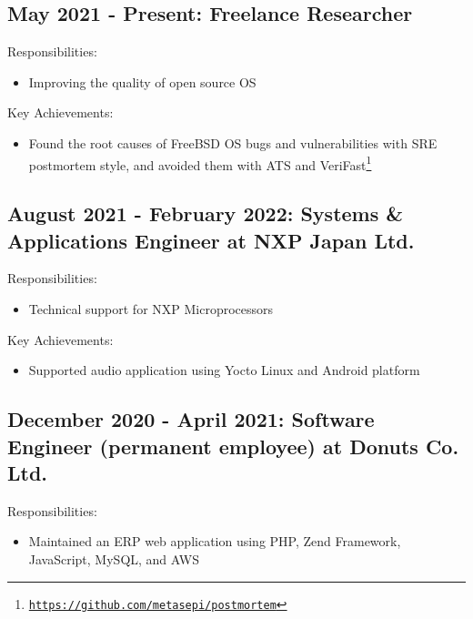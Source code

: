 \documentclass[letterpaper]{article}
\begin{document}
\subsection*{May 2021 - Present: Freelance Researcher}

\noindent Responsibilities:

\begin{itemize}
  \item Improving the quality of open source OS
\end{itemize}

\noindent Key Achievements:

\begin{itemize}
  \item Found the root causes of FreeBSD OS bugs and vulnerabilities with SRE postmortem style, and avoided them with ATS and VeriFast\footnote{\href{https://github.com/metasepi/postmortem}{\tt https://github.com/metasepi/postmortem}}
\end{itemize}

\subsection*{August 2021 - February 2022: Systems \& Applications Engineer at NXP Japan Ltd.}

\noindent Responsibilities:

\begin{itemize}
  \item Technical support for NXP Microprocessors
\end{itemize}

\noindent Key Achievements:

\begin{itemize}
  \item Supported audio application using Yocto Linux and Android platform
\end{itemize}

\subsection*{December 2020 - April 2021: Software Engineer (permanent employee) at Donuts Co. Ltd.}

\noindent Responsibilities:

\begin{itemize}
  \item Maintained an ERP web application using PHP, Zend Framework, JavaScript, MySQL, and AWS
\end{itemize}
\end{document}
